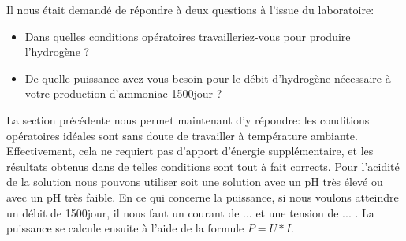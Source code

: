 \documentclass[10pt]{article}
\begin{document}
Il nous était demandé de répondre à deux questions à l'issue du laboratoire:
\begin{itemize}
\item Dans quelles conditions opératoires travailleriez-vous pour produire l’hydrogène ?
\item De quelle puissance avez-vous besoin pour le débit d’hydrogène nécessaire à votre production d’ammoniac \unit{1500}{\tonne \per jour} ? 
\end{itemize}
La section précédente nous permet maintenant d'y répondre: les conditions opératoires idéales sont sans doute
de travailler à température ambiante. Effectivement, cela ne requiert pas d'apport d'énergie supplémentaire, et 
les résultats obtenus dans de telles conditions sont tout à fait corrects. Pour l'acidité de la solution nous pouvons
utiliser soit une solution avec un pH très élevé ou avec un pH très faible. En ce qui concerne la puissance, si nous 
voulons atteindre un débit de \unit{1500}{\tonne \per jour}, il nous faut un courant de ... et une tension de ... . La puissance se calcule ensuite à l'aide de la formule $P = U*I$.
\end{document}
